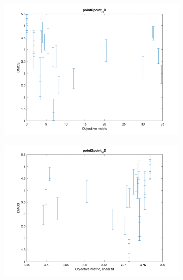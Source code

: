 \documentclass{article}
\begin{document}
\begin{figure}
   
    \centering
   \begin{subfigure}[b]{0.65\textwidth}
   \includegraphics[width=\textwidth]{Figures/task3/p2p_hd.png}
   \end{subfigure}
   
   \begin{subfigure}[b]{0.65\textwidth}
   \includegraphics[width=\textwidth]{Figures/task3/p2p_hd_linear.png}
   \end{subfigure}
   

\end{figure}
\end{document}

